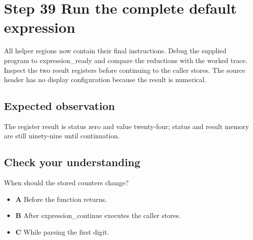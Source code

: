 \section{Step 39 Run the complete default expression}\label{expression-s39}

All helper regions now contain their final instructions. Debug the supplied program to expression\_ready and compare the reductions with the worked trace. Inspect the two result registers before continuing to the caller stores. The source header has no display configuration because the result is numerical.

\subsection{Expected observation}
The register result is status zero and value twenty-four; status and result memory are still ninety-nine until continuation.

\subsection{Check your understanding}
When should the stored counters change?

\begin{itemize}
  \item \textbf{A} Before the function returns.
  \item \textbf{B} After expression\_continue executes the caller stores.
  \item \textbf{C} While parsing the first digit.
\end{itemize}
